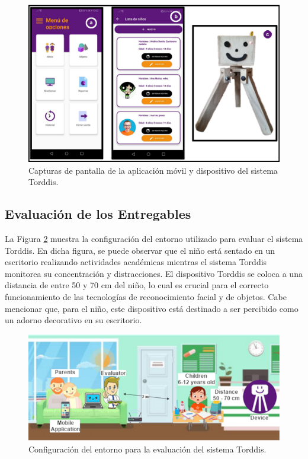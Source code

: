 \documentclass[a4paper,fleqn]{cas-sc}
\begin{document}
			\begin{figure}[h]
				\centering
				\includegraphics[width=\linewidth]{figs/Figure_9}
				\caption{Capturas de pantalla de la aplicación móvil y dispositivo del sistema Torddis.\label{fig:TorddisApp}} 
			\end{figure}
			
		\subsection{Evaluación de los Entregables}
			La Figura \ref{fig:ConfigEvaluation} muestra la configuración del entorno utilizado para evaluar el sistema Torddis. En dicha figura, se puede observar que el niño está sentado en un escritorio realizando actividades académicas mientras el sistema Torddis monitorea su concentración y distracciones. El dispositivo Torddis se coloca a una distancia de entre 50 y 70 cm del niño, lo cual es crucial para el correcto funcionamiento de las tecnologías de reconocimiento facial y de objetos. Cabe mencionar que, para el niño, este dispositivo está destinado a ser percibido como un adorno decorativo en su escritorio.
		
			\begin{figure}[h]
				\centering
				\includegraphics[width=\linewidth]{figs/Figure_10}
				\caption{Configuración del entorno para la evaluación del sistema Torddis. \label{fig:ConfigEvaluation}} 
			\end{figure}
			
\end{document}
